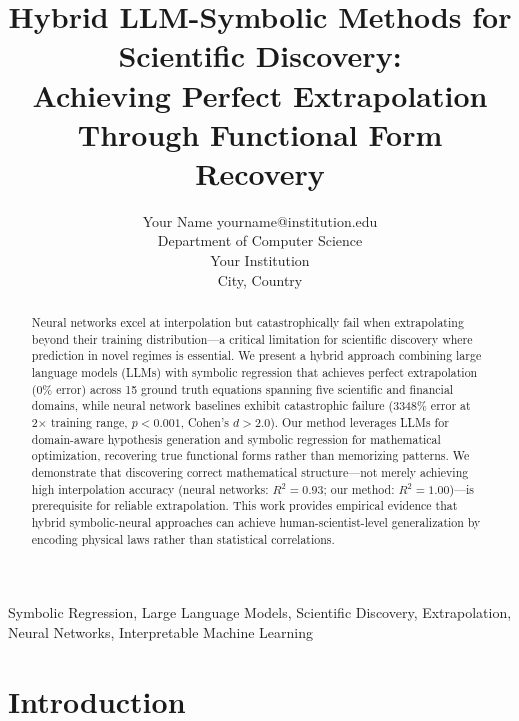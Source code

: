 \documentclass[twoside,11pt]{article}
\begin{document}
\title{Hybrid LLM-Symbolic Methods for Scientific Discovery: \\
       Achieving Perfect Extrapolation Through Functional Form Recovery}

\author{\name Your Name \email yourname@institution.edu \\
       \addr Department of Computer Science\\
       Your Institution\\
       City, Country}


\maketitle

\begin{abstract}
Neural networks excel at interpolation but catastrophically fail when extrapolating beyond their training distribution---a critical limitation for scientific discovery where prediction in novel regimes is essential. We present a hybrid approach combining large language models (LLMs) with symbolic regression that achieves perfect extrapolation (0\% error) across 15 ground truth equations spanning five scientific and financial domains, while neural network baselines exhibit catastrophic failure (3348\% error at 2× training range, $p < 0.001$, Cohen's $d > 2.0$). Our method leverages LLMs for domain-aware hypothesis generation and symbolic regression for mathematical optimization, recovering true functional forms rather than memorizing patterns. We demonstrate that discovering correct mathematical structure---not merely achieving high interpolation accuracy (neural networks: $R^2 = 0.93$; our method: $R^2 = 1.00$)---is prerequisite for reliable extrapolation. This work provides empirical evidence that hybrid symbolic-neural approaches can achieve human-scientist-level generalization by encoding physical laws rather than statistical correlations.
\end{abstract}

\begin{keywords}
  Symbolic Regression, Large Language Models, Scientific Discovery, Extrapolation, Neural Networks, Interpretable Machine Learning
\end{keywords}

\section{Introduction}
\end{document}
